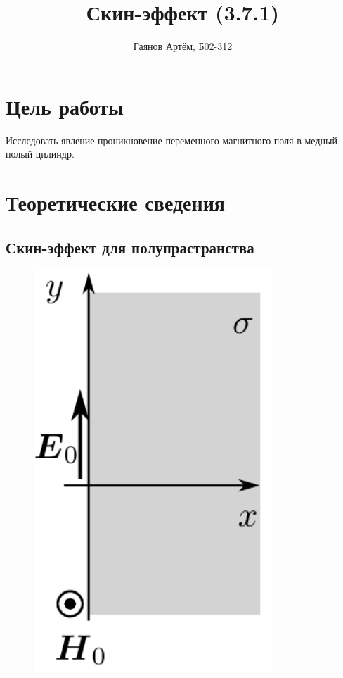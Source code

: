 \documentclass[12pt, a4paper]{article}
\title{Скин-эффект (3.7.1)}
\author{Гаянов Артём, Б02-312}
\date{}
\begin{document}
\maketitle

\section{Цель работы}
Исследовать явление проникновение переменного магнитного поля в медный полый цилиндр. 

\section{Теоретические сведения}
\subsection*{Скин-эффект для полупрастранства}
\vspace{1cm}
\begin{figure}
  \begin{center}
    \includegraphics[width=0.8\textwidth]{pics/poluprostranstvo}
  \end{center}
\end{figure}
\end{document}
